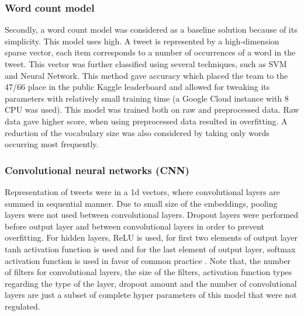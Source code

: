 \documentclass[10pt,conference,compsocconf]{IEEEtran}
\begin{document}
\subsubsection{Word count model}
Secondly, a word count model was considered as a baseline solution because of its simplicity. This model uses high. A tweet is represented by a high-dimension sparse vector, each item corresponds to a number of occurrences of a word in the tweet.
This vector was further classified using several techniques, such as SVM and Neural Network.
This method gave accuracy which placed the team to the 47/66 place in the public Kaggle leaderboard and allowed for tweaking its parameters with relatively small training time (a Google Cloud instance with 8 CPU was used).
This model was trained both on raw and preprocessed data. Raw data gave higher score, when using preprocessed data resulted in overfitting. A reduction of the vocabulary size was also considered by taking only words occurring most frequently.
\subsubsection{Convolutional neural networks (CNN)}

Representation of tweets were in a 1d vectors, where convolutional layers are summed in sequential manner. Due to small size of the embeddings, pooling layers were not used between convolutional layers. Dropout layers were performed before output layer and between convolutional layers \cite{cnn5} in order to prevent overfitting. For hidden layers, ReLU is used, for first two elements of output layer tanh activation function is used and for the last element of output layer, softmax activation function is used in favor of common practice \cite{cnn6}.
Note that, the number of filters for convolutional layers, the size of the filters, activation function types regarding the type of the layer, dropout amount and the number of convolutional layers are just a subset of complete hyper parameters of this model that were not regulated.
\end{document}
